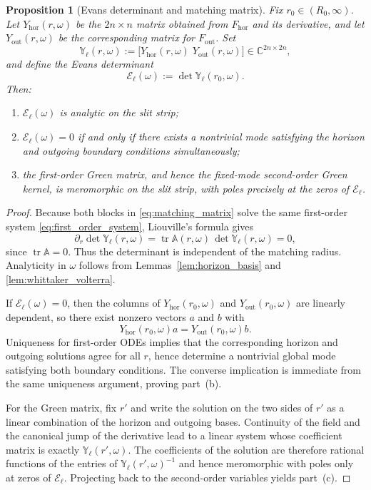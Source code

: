 \documentclass[12pt]{article}
\numberwithin{equation}{section}
\theoremstyle{plain}
\newtheorem{proposition}[theorem]{Proposition}
\theoremstyle{definition}
\theoremstyle{remark}
\newcommand{\C}{\mathbb C}
\newcommand{\hor}{\mathrm{hor}}
\newcommand{\out}{\mathrm{out}}
\newcommand{\cE}{\mathcal E}
\newcommand{\om}{\omega}
\begin{document}
\begin{proposition}[Evans determinant and matching matrix]\label{prop:evans_det}
Fix $r_0\in(R_0,\infty)$.  Let $Y_{\hor}(r,\om)$ be the $2n\times n$ matrix obtained from $F_{\hor}$ and its derivative, and let $Y_{\out}(r,\om)$ be the corresponding matrix for $F_{\out}$.  Set
\begin{equation}\label{eq:matching_matrix}
   \mathbb Y_\ell(r,\om):=\bigl[Y_{\hor}(r,\om)\;Y_{\out}(r,\om)\bigr]\in\C^{2n\times2n},
\end{equation}
and define the Evans determinant
\begin{equation}\label{eq:evans_def}
   \cE_\ell(\om):=\det\mathbb Y_\ell(r_0,\om).
\end{equation}
Then:
\begin{enumerate}[label=\textnormal{(\alph*)}]
   \item $\cE_\ell(\om)$ is analytic on the slit strip;
   \item $\cE_\ell(\om)=0$ if and only if there exists a nontrivial mode satisfying the horizon and outgoing boundary conditions simultaneously;
   \item the first-order Green matrix, and hence the fixed-mode second-order Green kernel, is meromorphic on the slit strip, with poles precisely at the zeros of $\cE_\ell$.
\end{enumerate}
\end{proposition}

\begin{proof}
Because both blocks in \eqref{eq:matching_matrix} solve the same first-order system \eqref{eq:first_order_system}, Liouville's formula gives
\[
   \partial_r\det\mathbb Y_\ell(r,\omega)
   =\operatorname{tr}\mathbb A(r,\omega)\,\det\mathbb Y_\ell(r,\omega)=0,
\]
since $\operatorname{tr}\mathbb A=0$.  Thus the determinant is independent of the matching radius.  Analyticity in $\omega$ follows from Lemmas~\ref{lem:horizon_basis} and \ref{lem:whittaker_volterra}.

If $\cE_\ell(\omega)=0$, then the columns of $Y_{\hor}(r_0,\omega)$ and $Y_{\out}(r_0,\omega)$ are linearly dependent, so there exist nonzero vectors $a$ and $b$ with
\[
   Y_{\hor}(r_0,\omega)a=Y_{\out}(r_0,\omega)b.
\]
Uniqueness for first-order ODEs implies that the corresponding horizon and outgoing solutions agree for all $r$, hence determine a nontrivial global mode satisfying both boundary conditions.  The converse implication is immediate from the same uniqueness argument, proving part~(b).

For the Green matrix, fix $r'$ and write the solution on the two sides of $r'$ as a linear combination of the horizon and outgoing bases.  Continuity of the field and the canonical jump of the derivative lead to a linear system whose coefficient matrix is exactly $\mathbb Y_\ell(r',\omega)$.  The coefficients of the solution are therefore rational functions of the entries of $\mathbb Y_\ell(r',\omega)^{-1}$ and hence meromorphic with poles only at zeros of $\cE_\ell$.  Projecting back to the second-order variables yields part~(c).
\end{proof}
\end{document}
